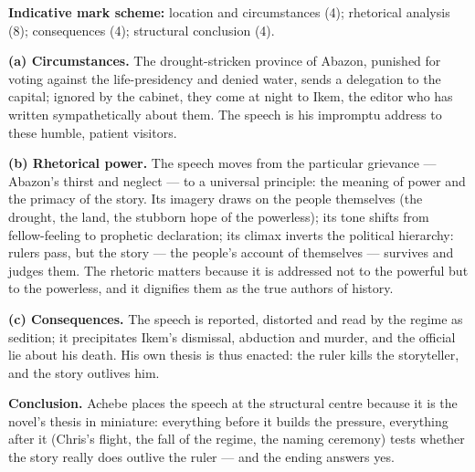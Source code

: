\documentclass[11pt]{article}
\begin{document}
\begin{corrige}
\textbf{Indicative mark scheme:} location and circumstances (4); rhetorical analysis (8); consequences (4); structural conclusion (4).

\textbf{(a) Circumstances.} The drought-stricken province of Abazon, punished for voting against the life-presidency and denied water, sends a delegation to the capital; ignored by the cabinet, they come at night to Ikem, the editor who has written sympathetically about them. The speech is his impromptu address to these humble, patient visitors.

\textbf{(b) Rhetorical power.} The speech moves from the particular grievance --- Abazon's thirst and neglect --- to a universal principle: the meaning of power and the primacy of the story. Its imagery draws on the people themselves (the drought, the land, the stubborn hope of the powerless); its tone shifts from fellow-feeling to prophetic declaration; its climax inverts the political hierarchy: rulers pass, but the story --- the people's account of themselves --- survives and judges them. The rhetoric matters because it is addressed not to the powerful but to the powerless, and it dignifies them as the true authors of history.

\textbf{(c) Consequences.} The speech is reported, distorted and read by the regime as sedition; it precipitates Ikem's dismissal, abduction and murder, and the official lie about his death. His own thesis is thus enacted: the ruler kills the storyteller, and the story outlives him.

\textbf{Conclusion.} Achebe places the speech at the structural centre because it is the novel's thesis in miniature: everything before it builds the pressure, everything after it (Chris's flight, the fall of the regime, the naming ceremony) tests whether the story really does outlive the ruler --- and the ending answers yes.
\end{corrige}
\end{document}
